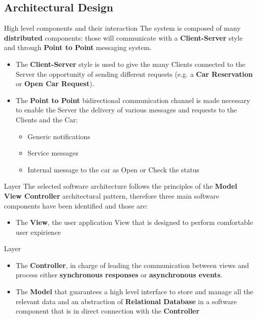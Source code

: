 \documentclass{../Common/Structure/pdf_presentation}
\begin{document}
	\subsection{Architectural Design}
	\begin{frame}{High level components and their interaction}
		The system is composed of many \textbf{distributed} components: those will communicate with a \textbf{Client-Server} style and through \textbf{Point to Point} messaging system.
		\begin{itemize}
			\item The \textbf{Client-Server} style is used to give the many Clients connected to the Server the opportunity of sending different requests (e.g. a \textbf{Car Reservation} or \textbf{Open Car Request}).
			\item The \textbf{Point to Point} bidirectional communication channel is made necessary to enable the Server the delivery of various messages and requests to the Clients and the Car:
			\begin{itemize}
				\item Generic notifications
				\item Service messages
				\item Internal message to the car as Open or Check the status
			\end{itemize}
		\end{itemize}
	\end{frame}
	\begin{frame}{Layer}
		The selected software architecture follows the principles of the \textbf{Model View Controller} architectural pattern, therefore three main software components have been identified and those are:
		\begin{itemize}
			\item The \textbf{View}, the user application View that is designed to perform comfortable user expirience
		\end{itemize}
	\end{frame}
	\begin{frame}{Layer}
		\begin{itemize}
			\item The \textbf{Controller}, in charge of leading the communication between views and process either \textbf{synchronous responses} or \textbf{asynchronous events}.
			\item The \textbf{Model} that guarantees a high level interface to store and manage all the \PowerEnJoy{} relevant data and an abstraction of \textbf{Relational Database} in a software component that is in direct connection with the \textbf{Controller}
		\end{itemize}
	\end{frame}
\end{document}
